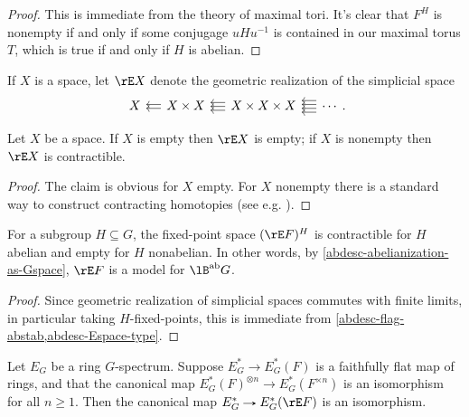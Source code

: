 \begin{proof}
  This is immediate from the theory of maximal tori. It's clear that
  $F^H$ is nonempty if and only if some conjugage $uHu^{-1}$ is
  contained in our maximal torus $T$, which is true if and only if $H$
  is abelian.
\end{proof}

\begin{notation}
  \label{abdesc-Espace}
  If $X$ is a space, let $\rE X$ denote the geometric realization of
  the simplicial space
  \[
  \simpl{X}{X \times X}{X \times X \times X}.
  \]
\end{notation}

\begin{lemma}
  \label{abdesc-Espace-type}
  Let $X$ be a space. If $X$ is empty then $\rE X$ is empty; if $X$ is
  nonempty then $\rE X$ is contractible.
\end{lemma}

\begin{proof}
  The claim is obvious for $X$ empty. For $X$ nonempty there is a
  standard way to construct contracting homotopies (see
  e.g. \cite[3.14]{dugger-primer}).
\end{proof}

\begin{lemma}
  \label{abdesc-BabG-construction}
  For a subgroup $H \subseteq G$, the fixed-point space $(\rE F)^H$ is
  contractible for $H$ abelian and empty for $H$ nonabelian. In other
  words, by \cref{abdesc-abelianization-as-Gspace}, $\rE F$ is a model
  for $\lB^\ab G$.
\end{lemma}

\begin{proof}
  Since geometric realization of simplicial spaces commutes with
  finite limits, in particular taking $H$-fixed-points, this is
  immediate from \cref{abdesc-flag-abstab,abdesc-Espace-type}.
\end{proof}

\begin{lemma}
  \label{abdesc-flag-faithflat}
  Let $E_G$ be a ring $G$-spectrum. Suppose $E_G^* \to E_G^*(F)$ is a
  faithfully flat map of rings, and that the canonical map
  $E_G^*(F)^{\otimes n} \to E_G^*(F^{\times n})$ is an isomorphism for
  all $n \ge 1$. Then the canonical map $E_G^* \to E_G^*(\rE F)$ is an
  isomorphism.
\end{lemma}


